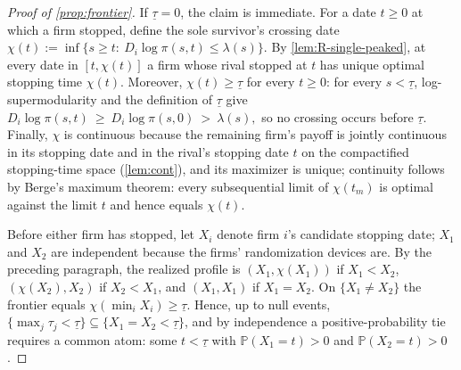 \documentclass[12pt,reqno]{article}
\renewcommand{\Pr}{\mathbb{P}}
\theoremstyle{definition} \newtheorem{example}{Example}
\theoremstyle{definition} \newtheorem{condition}{Condition}
\theoremstyle{definition} \newtheorem{corollary}{Corollary}
\theoremstyle{definition} \newtheorem{claim}{Claim}
\theoremstyle{definition} \newtheorem{definition}{Definition}
\theoremstyle{definition} \newtheorem{conjecture}{Conjecture}
\theoremstyle{definition} \newtheorem{Lemma}{Lemma}
\theoremstyle{definition} \newtheorem{lemma}{Lemma}
\theoremstyle{plain} \newtheorem{theorem}{Theorem}
\theoremstyle{definition} \newtheorem{assumption}{Assumption}
\theoremstyle{definition} \newtheorem*{assumptionnonumber}{Assumption}
\theoremstyle{definition} \newtheorem*{theoremNoNumber}{Proposition}
\theoremstyle{definition}
\theoremstyle{definition}\newtheorem{proposition}{Proposition}
\theoremstyle{definition} \newtheorem{result}{Result}
\theoremstyle{definition} \newtheorem*{definitionNoNumber}{Definition}
\theoremstyle{definition} \newtheorem{Definition}{Definition}
\theoremstyle{definition} \newtheorem*{DefinitionNoNumber}{Definition}
\theoremstyle{definition} \newtheorem*{fact}{Fact}
\theoremstyle{definition} \newtheorem*{property}{Property}
\theoremstyle{definition} \newtheorem{remark}{Remark}
\begin{document}
\begin{proof}[Proof of \cref{prop:frontier}]
If $\underline\tau=0$, the claim is immediate. For a date $t\ge0$ at which a firm stopped, define the sole survivor's crossing date
$
\chi(t):=\inf\big\{s\ge t:\ D_i\log\pi(s,t)\le\lambda(s)\big\}.$
By \cref{lem:R-single-peaked},  at every date in $[t,\chi(t)]$ a firm whose rival stopped at $t$ has unique optimal stopping time $\chi(t)$.  Moreover, $\chi(t)\ge\underline\tau$ for every $t\ge0$: for every $s<\underline\tau$, log-supermodularity and the definition of $\underline\tau$ give
$
D_i\log\pi(s,t)\ \geq\ D_i\log\pi(s,0)\ >\ \lambda(s),
$
so no crossing occurs before $\underline\tau$. Finally, $\chi$ is continuous because the remaining firm's payoff is jointly continuous in its stopping date and in the rival's stopping date $t$ on the compactified stopping-time space (\cref{lem:cont}), and its maximizer is unique; continuity follows by Berge's maximum theorem: every subsequential limit of $\chi(t_m)$ is optimal against the limit $t$ and hence equals $\chi(t)$.


Before either firm has stopped, let $X_i$ denote firm $i$'s candidate stopping date; $X_1$ and $X_2$ are independent because the firms' randomization devices are. By the preceding paragraph, the realized profile is $(X_1,\chi(X_1))$ if $X_1<X_2$, $(\chi(X_2),X_2)$ if $X_2<X_1$, and $(X_1,X_1)$ if $X_1=X_2$. On $\{X_1\neq X_2\}$ the frontier equals $\chi(\min_iX_i)\ge\underline\tau$. Hence, up to null events, $\{\max_j\tau_j<\underline\tau\}\subseteq\{X_1=X_2<\underline\tau\}$, and by independence a positive-probability tie requires a common atom: some $t<\underline\tau$ with $\Pr(X_1=t)>0$ and $\Pr(X_2=t)>0$.


\end{proof}
\end{document}
